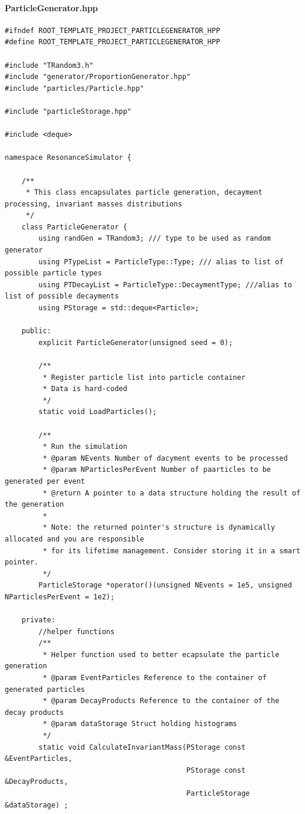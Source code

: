 \documentclass[12pt, a4paper]{article}
\begin{document}
\paragraph{ParticleGenerator.hpp}

\begin{verbatim}
#ifndef ROOT_TEMPLATE_PROJECT_PARTICLEGENERATOR_HPP
#define ROOT_TEMPLATE_PROJECT_PARTICLEGENERATOR_HPP

#include "TRandom3.h"
#include "generator/ProportionGenerator.hpp"
#include "particles/Particle.hpp"

#include "particleStorage.hpp"

#include <deque>

namespace ResonanceSimulator {

    /**
     * This class encapsulates particle generation, decayment processing, invariant masses distributions
     */
    class ParticleGenerator {
        using randGen = TRandom3; /// type to be used as random generator
        using PTypeList = ParticleType::Type; /// alias to list of possible particle types
        using PTDecayList = ParticleType::DecaymentType; ///alias to list of possible decayments
        using PStorage = std::deque<Particle>;

    public:
        explicit ParticleGenerator(unsigned seed = 0);

        /**
         * Register particle list into particle container
         * Data is hard-coded
         */
        static void LoadParticles();

        /**
         * Run the simulation
         * @param NEvents Number of dacyment events to be processed
         * @param NParticlesPerEvent Number of paarticles to be generated per event
         * @return A pointer to a data structure holding the result of the generation
         *
         * Note: the returned pointer's structure is dynamically allocated and you are responsible
         * for its lifetime management. Consider storing it in a smart pointer.
         */
        ParticleStorage *operator()(unsigned NEvents = 1e5, unsigned NParticlesPerEvent = 1e2);

    private:
        //helper functions
        /**
         * Helper function used to better ecapsulate the particle generation
         * @param EventParticles Reference to the container of generated particles
         * @param DecayProducts Reference to the container of the decay products
         * @param dataStorage Struct holding histograms
         */
        static void CalculateInvariantMass(PStorage const &EventParticles,
                                           PStorage const &DecayProducts,
                                           ParticleStorage &dataStorage) ;


\end{verbatim}
\end{document}
